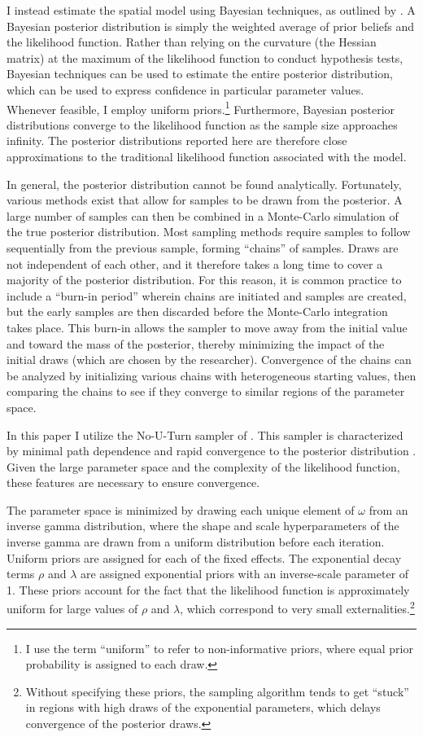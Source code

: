\documentclass[12pt]{article}
\renewcommand{\citet}[1]{\citeauthor{#1} \citeyearpar{#1}}
\begin{document}
I instead estimate the spatial model using Bayesian techniques, as outlined by \citet{lesage2009}. A Bayesian posterior distribution is simply the weighted average of prior beliefs and the likelihood function. Rather than relying on the curvature (the Hessian matrix) at the maximum of the likelihood function to conduct hypothesis tests, Bayesian techniques can be used to estimate the entire posterior distribution, which can be used to express confidence in particular parameter values. Whenever feasible, I employ uniform priors.\footnote{I use the term ``uniform'' to refer to non-informative priors, where equal prior probability is assigned to each draw.} Furthermore, Bayesian posterior distributions converge to the likelihood function as the sample size approaches infinity. The posterior distributions reported here are therefore close approximations to the traditional likelihood function associated with the model. 

In general, the posterior distribution cannot be found analytically. Fortunately, various methods exist that allow for samples to be drawn from the posterior. A large number of samples can then be combined in a Monte-Carlo simulation of the true posterior distribution. Most sampling methods require samples to follow sequentially from the previous sample, forming ``chains'' of samples. Draws are not independent of each other, and it therefore takes a long time to cover a majority of the posterior distribution. For this reason, it is common practice to include a ``burn-in period'' wherein chains are initiated and samples are created, but the early samples are then discarded before the Monte-Carlo integration takes place. This burn-in allows the sampler to move away from the initial value and toward the mass of the posterior, thereby minimizing the impact of the initial draws (which are chosen by the researcher). Convergence of the chains can be analyzed by initializing various chains with heterogeneous starting values, then comparing the chains to see if they converge to similar regions of the parameter space.

In this paper I utilize the No-U-Turn sampler of \citet{homan2014}. This sampler is characterized by minimal path dependence and rapid convergence to the posterior distribution \citep{neal2011}. Given the large parameter space and the complexity of the likelihood function, these features are necessary to ensure convergence. 

The parameter space is minimized by drawing each unique element of $\omega$ from an inverse gamma distribution, where the shape and scale hyperparameters of the inverse gamma are drawn from a uniform distribution before each iteration. Uniform priors are assigned for each of the fixed effects. The exponential decay terms $\rho$ and $\lambda$ are assigned exponential priors with an inverse-scale parameter of 1. These priors account for the fact that the likelihood function is approximately uniform for large values of $\rho$ and $\lambda$, which correspond to very small externalities.\footnote{Without specifying these priors, the sampling algorithm tends to get ``stuck'' in regions with high draws of the exponential parameters, which delays convergence of the posterior draws. }
\end{document}
